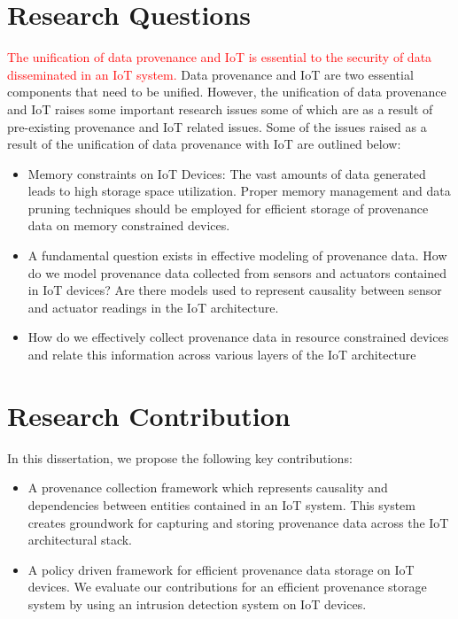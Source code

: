\section{Research Questions}
\textcolor{red}{The unification of data provenance and IoT is essential to the security of data disseminated in an IoT system.} Data provenance and IoT are two essential components that need to be unified. However, the unification of data provenance and IoT raises some important research issues some of which are as a result of pre-existing provenance and IoT related issues. Some of the issues raised as a result of the unification of data provenance with IoT are outlined below:

\begin{itemize}

\item Memory constraints on IoT Devices: The vast amounts of data generated leads to high storage space utilization. Proper memory management and data pruning techniques should be employed for efficient storage of provenance data on memory constrained devices. 

\item A fundamental question exists in effective modeling of provenance data. How do we model provenance data collected from sensors and actuators contained in IoT devices? Are there models used to represent causality between sensor and actuator readings in the IoT architecture.

\item How do we effectively collect provenance data in resource constrained devices and relate this information across various layers of the IoT architecture

\end{itemize}

\section{Research Contribution}

In this dissertation, we propose the following key contributions:

\begin{itemize}
  \item A provenance collection framework which represents causality and dependencies between entities contained in an IoT system. This system creates groundwork for capturing and storing provenance data  across the IoT architectural stack.
  \item A policy driven framework for efficient provenance data storage on IoT devices. We evaluate our contributions for an efficient provenance storage system by using an intrusion detection system on IoT devices.
\end{itemize}

